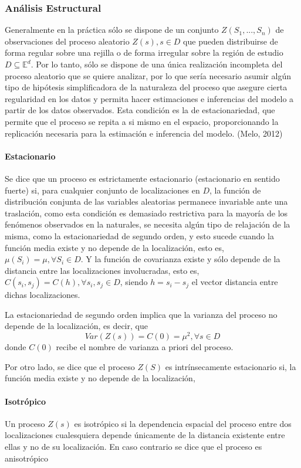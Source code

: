 \subsubsection{Análisis Estructural}

Generalmente en la práctica sólo se dispone de un conjunto ${Z(S_1, ... , S_n)}$  de observaciones del proceso aleatorio ${Z(s), s \in D}$ que pueden distribuirse de forma regular sobre una rejilla o de forma irregular sobre la región de estudio $D \subseteq \mathbb{E}^d$. Por lo tanto, sólo se dispone de una única realización incompleta del proceso aleatorio que se quiere analizar, por lo que sería necesario asumir algún tipo de hipótesis simplificadora de la naturaleza del proceso que asegure cierta regularidad en los datos y permita hacer estimaciones e inferencias del modelo a partir de los datos observados. Esta condición es la de estacionariedad, que permite que el proceso se repita a si mismo en el espacio, proporcionando la replicación necesaria para la estimación e inferencia del modelo. (Melo, 2012) \cite{melo}


\paragraph{Estacionario}
Se dice que un proceso es estrictamente estacionario (estacionario en sentido fuerte) si, para cualquier conjunto de localizaciones en $D$, la función de distribución conjunta de las variables aleatorias permanece invariable ante una traslación, como esta condición es demasiado restrictiva para la mayoría de los fenómenos observados en la naturales, se necesita algún tipo de relajación de la misma, como la estacionariedad de segundo orden, y esto sucede cuando la función media existe y no depende de la localización, esto es, $\mu(S_i) =  \mu,  \forall  S_i \in D $. Y la función de covarianza existe y sólo depende de la distancia entre las localizaciones involucradas, esto es, $C(s_i,s_j) = C(h), \forall s_i, s_j \in D$, siendo $h=s_i-s_j$ el vector distancia entre dichas localizaciones.

La estacionariedad de segundo orden implica que la varianza del proceso no depende de la localización, es decir, que $$Var(Z(s))=C(0)= \mu^2, \forall s \in D$$ donde $C(0)$ recibe el nombre de varianza a priori del proceso.

Por otro lado, se dice que el proceso $Z(S)$ es intrínsecamente estacionario si, la función media existe y no depende de la localización, 

\paragraph{Isotrópico} Un proceso $Z(s)$ es isotrópico si la dependencia espacial del proceso entre dos localizaciones cualesquiera depende únicamente de la distancia existente entre ellas y no de su localización. En caso contrario se dice que el proceso es anisotrópico

